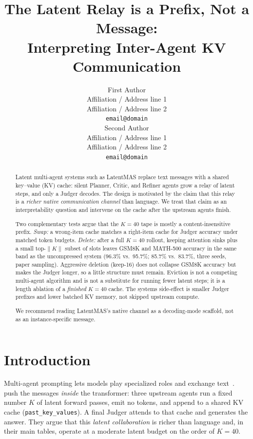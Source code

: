 \documentclass[11pt]{article}
\title{The Latent Relay is a Prefix, Not a Message:\\
Interpreting Inter-Agent KV Communication}
\author{First Author \\
  Affiliation / Address line 1 \\
  Affiliation / Address line 2 \\
  \texttt{email@domain} \\\And
  Second Author \\
  Affiliation / Address line 1 \\
  Affiliation / Address line 2 \\
  \texttt{email@domain} \\}
\begin{document}
\maketitle
\begin{abstract}
Latent multi-agent systems such as LatentMAS replace text messages with a
shared key--value (KV) cache: silent Planner, Critic, and Refiner agents grow
a relay of latent steps, and only a Judger decodes. The design is motivated by
the claim that this relay is a \emph{richer native communication channel} than
language. We treat that claim as an interpretability question and intervene on
the cache after the upstream agents finish.

Two complementary tests argue that the $K{=}40$ tape is mostly a
content-insensitive prefix. \emph{Swap:} a wrong-item cache matches a
right-item cache for Judger accuracy under matched token budgets.
\emph{Delete:} after a full $K{=}40$ rollout, keeping attention sinks plus a
small top-$\|K\|$ subset of slots leaves GSM8K and MATH-500 accuracy in the
same band as the uncompressed system (96.3\% vs.\ 95.7\%; 85.7\% vs.\ 83.7\%,
three seeds, paper sampling). Aggressive deletion (keep-16) does not collapse
GSM8K accuracy but makes the Judger longer, so a little structure must remain.
Eviction is not a competing multi-agent algorithm and is not a substitute for
running fewer latent steps; it is a length ablation of a \emph{finished}
$K{=}40$ cache. The systems side-effect is smaller Judger prefixes and lower
batched KV memory, not skipped upstream compute.

We recommend reading LatentMAS's native channel as a decoding-mode scaffold,
not as an instance-specific message.
\end{abstract}

\section{Introduction}
\label{sec:intro}

Multi-agent prompting lets models play specialized roles and exchange
text~\citep{du2023society,wu2023autogen,wei2022cot}.
\citet{zou2025latentmas} push the messages \emph{inside} the transformer:
three upstream agents run a fixed number $K$ of latent forward passes,
emit no tokens, and append to a shared KV cache
(\texttt{past\_key\_values}). A final Judger attends to that cache and
generates the answer. They argue that this \emph{latent collaboration} is
richer than language and, in their main tables, operate at a moderate latent
budget on the order of $K{=}40$.
\end{document}
